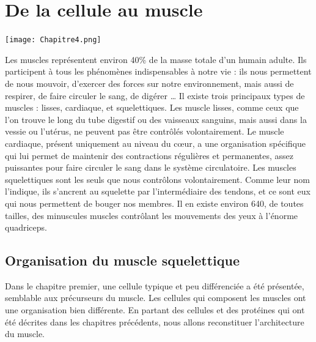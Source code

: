 %
%
%
%
\chapter{De la cellule au muscle}

\begin{center}
\texttt{[image: Chapitre4.png]}

\end{center}
\newpage

Les muscles représentent environ 40\% de la masse totale d'un humain adulte. Ils participent à tous les phénomènes indispensables à notre vie : ils nous permettent de nous mouvoir, d'exercer des forces sur notre environnement, mais aussi de respirer, de faire circuler le sang, de digérer \dots 
Il existe trois principaux types de muscles : lisses, cardiaque, et squelettiques. Les muscle lisses, comme ceux que l'on trouve le long du tube digestif ou des vaisseaux sanguins, mais aussi dans la vessie ou l'utérus, ne peuvent pas être contrôlés volontairement. 
Le muscle cardiaque, présent uniquement au niveau du c\oe ur, a une organisation spécifique qui lui permet de maintenir des contractions régulières et permanentes, assez puissantes pour faire circuler le sang dans le système circulatoire. 
Les muscles squelettiques sont les seuls que nous contrôlons volontairement. Comme leur nom l'indique, ils s'ancrent au squelette par l'intermédiaire des tendons, et ce sont eux qui nous permettent de bouger nos membres.  
Il en existe environ 640, de toutes tailles, des minuscules muscles contrôlant les mouvements des yeux à l'énorme quadriceps.

\section{Organisation du muscle squelettique}

Dans le chapitre premier, une cellule typique et peu différenciée a été présentée, semblable aux précurseurs du muscle. Les cellules qui composent les muscles ont une organisation bien différente. 
En partant des cellules et des protéines qui ont été décrites dans les chapitres précédents, nous allons reconstituer l'architecture du muscle. 


